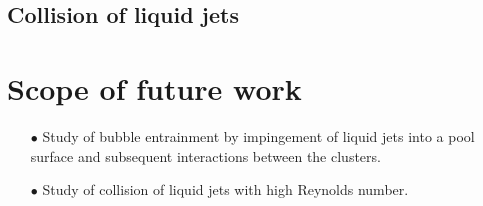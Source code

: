 \subsection{Collision of liquid jets}
\section{Scope of future work}
\begin{enumerate}
\item [$\bullet$] Study of bubble entrainment by impingement of liquid jets into a pool surface and subsequent interactions between the clusters. 
\item [$\bullet$] Study of collision of liquid jets with high Reynolds number.
\end{enumerate}
